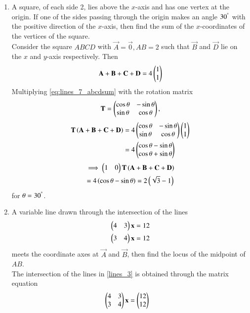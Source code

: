 \documentclass[journal,12pt,twocolumn]{IEEEtran}
\begin{document}
\begin{enumerate}[label=\arabic*]
\item A square, of each side 2, lies above the $x$-axis and has one vertex at the origin.  If one of the sides 
passing through the origin makes an angle $30^{\degree}$ with the positive direction of the $x$-axis, then 
find the 
sum of the $x$-coordinates of the vertices of the square.
\\
\solution Consider the square $ABCD$ with $\vec{A} = \vec{0}, AB = 2$ such that $\vec{B}$ and $\vec{D}$ lie on the $x$ and $y$-axis respectively. Then 
\begin{align}
\mathbf{A}+\mathbf{B}+\mathbf{C}+\mathbf{D} = 4\begin{pmatrix}1 \\ 1\end{pmatrix}
\label{eq:lines_7_abcdsum}
\end{align}
%
Multiplying \eqref{eq:lines_7_abcdsum} with the rotation matrix 
\begin{align}
\label{eq:lines_7_t}
\mathbf{T} = \begin{pmatrix}\cos \theta & -\sin \theta \\ \sin \theta & \cos \theta\end{pmatrix},
\end{align}
\begin{align}
\mathbf{T}\left(\mathbf{A}+\mathbf{B}+\mathbf{C}+\mathbf{D}\right) &= 4\begin{pmatrix}\cos \theta & -\sin \theta \\ \sin \theta & \cos \theta\end{pmatrix}\begin{pmatrix}1 \\ 1\end{pmatrix}
\nonumber \\
&= 4\begin{pmatrix}\cos \theta  -\sin \theta \\ \cos \theta + \sin \theta\end{pmatrix}
\end{align}
\begin{multline}
\implies \begin{pmatrix}1 & 0\end{pmatrix}\mathbf{T}\left(\mathbf{A}+\mathbf{B}+\mathbf{C}+\mathbf{D}\right) 
\\
= 4\left(\cos \theta  -\sin \theta\right)
= 2\left(\sqrt{3}-1\right)
\end{multline}
%
for $\theta = 30^{\degree}$.
\item A variable line drawn through the 
intersection of the lines 
\begin{align} 
\label{lines_3}
\begin{pmatrix}4 & 3\end{pmatrix}\mathbf{x} &=12 
\\ 
\begin{pmatrix}3 & 4\end{pmatrix}\mathbf{x} &=12 
\end{align} 
meets the coordinate axes at $\vec{A}$ and $\vec{B}$, then find the locus of the midpoint of $AB$. 
\\
\solution The intersection of the lines in \eqref{lines_3} is obtained through the matrix equation 
\begin{align}
\myvec{4 & 3 \\ 3 & 4}\vec{x}  &=\myvec{12\\12}

\end{align}
\end{enumerate}
\end{document}
